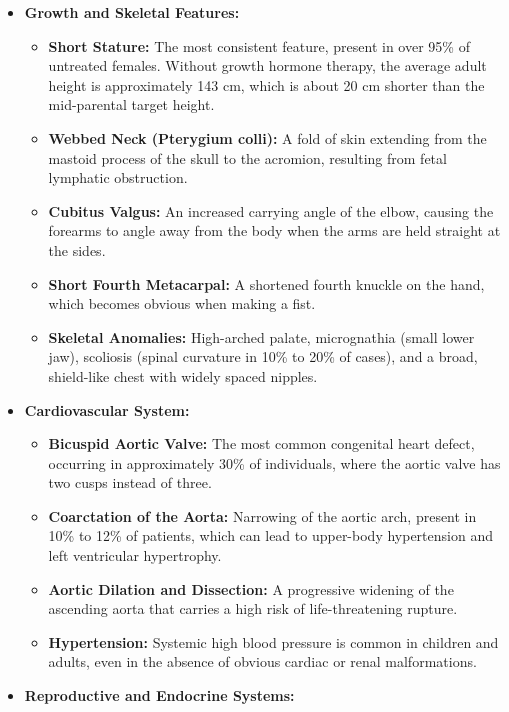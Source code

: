 \begin{itemize}
    \item \textbf{Growth and Skeletal Features:}
    \begin{itemize}
        \item \textbf{Short Stature:} The most consistent feature, present in over 95\% of untreated females. Without growth hormone therapy, the average adult height is approximately 143 cm, which is about 20 cm shorter than the mid-parental target height.
        \item \textbf{Webbed Neck (Pterygium colli):} A fold of skin extending from the mastoid process of the skull to the acromion, resulting from fetal lymphatic obstruction.
        \item \textbf{Cubitus Valgus:} An increased carrying angle of the elbow, causing the forearms to angle away from the body when the arms are held straight at the sides.
        \item \textbf{Short Fourth Metacarpal:} A shortened fourth knuckle on the hand, which becomes obvious when making a fist.
        \item \textbf{Skeletal Anomalies:} High-arched palate, micrognathia (small lower jaw), scoliosis (spinal curvature in 10\% to 20\% of cases), and a broad, shield-like chest with widely spaced nipples.
    \end{itemize}
    \item \textbf{Cardiovascular System:}
    \begin{itemize}
        \item \textbf{Bicuspid Aortic Valve:} The most common congenital heart defect, occurring in approximately 30\% of individuals, where the aortic valve has two cusps instead of three.
        \item \textbf{Coarctation of the Aorta:} Narrowing of the aortic arch, present in 10\% to 12\% of patients, which can lead to upper-body hypertension and left ventricular hypertrophy.
        \item \textbf{Aortic Dilation and Dissection:} A progressive widening of the ascending aorta that carries a high risk of life-threatening rupture.
        \item \textbf{Hypertension:} Systemic high blood pressure is common in children and adults, even in the absence of obvious cardiac or renal malformations.
    \end{itemize}
    \item \textbf{Reproductive and Endocrine Systems:}
    \begin{itemize}

\end{itemize}
\end{itemize}
